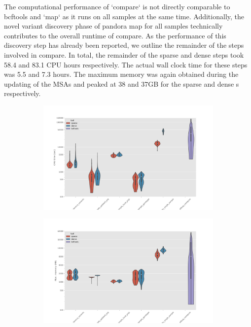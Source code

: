 The computational performance of \pandora{} `compare` is not directly comparable to bcftools and \pandora{} `map` as it runs on all samples at the same time. Additionally, the novel variant discovery phase of pandora map for all samples technically contributes to the overall runtime of compare. As the performance of this discovery step has already been reported, we outline the remainder of the steps involved in compare. In total, the remainder of the sparse and dense \prg{} steps took 58.4 and 83.1 CPU hours respectively. The actual wall clock time for these steps was 5.5 and 7.3 hours. The maximum memory was again obtained during the updating of the MSAs and peaked at 38 and 37GB for the sparse and dense \prg{}s respectively.

\begin{figure}
     \centering
     \begin{subfigure}[b]{0.475\textwidth}
         \centering
         \includegraphics[width=\textwidth]{Chapter2/Figs/cpu_time.png}
         \caption{}
         \label{fig:cpu-time}
     \end{subfigure}
     \begin{subfigure}[b]{0.475\textwidth}
         \centering
         \includegraphics[width=\textwidth]{Chapter2/Figs/max_mem.png}

\end{subfigure}
\end{figure}
